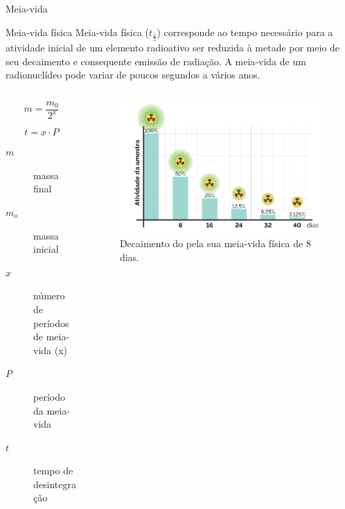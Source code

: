 \documentclass[presentation]{beamer}
\begin{document}
\begin{frame}[label={sec:org3134f85}]{Meia-vida}
\begin{block}{Meia-vida física}
Meia-vida física (\(t_{\frac{1}{2}}\)) corresponde ao tempo necessário para a atividade inicial de um elemento radioativo ser reduzida à metade por meio de seu decaimento e consequente emissão de radiação. A meia-vida de um radionuclídeo pode variar de poucos segundos a vários anos.



\begin{columns}
\begin{column}{0.45\columnwidth}
\begin{equation}
m=\frac{m_0}{2^x}
\end{equation}

\begin{equation}
t=x\cdot P
\end{equation}

\begin{description}
\item[{\(m\)}] massa final
\item[{\(m_o\)}] massa inicial
\item[{\(x\)}] número de períodos de meia-vida (x)
\item[{\(P\)}] período da meia-vida
\item[{\(t\)}] tempo de desintegração
\end{description}
\end{column}



\begin{column}{0.45\columnwidth}
\begin{figure}[H]
\centering
\includegraphics[scale=0.21]{./meia-vida.png}
\caption{\label{fig:org1fc8b96}Decaimento do    pela sua meia-vida física de 8 dias.}
\end{figure}
\end{column}
\end{columns}
\end{block}


\end{frame}
\end{document}
